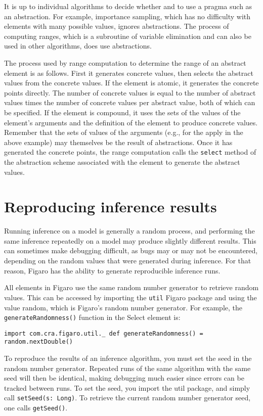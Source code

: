 It is up to individual algorithms to decide whether and to use a pragma such as an abstraction. For example, importance sampling, which has no difficulty with elements with many possible values, ignores abstractions. The process of computing ranges, which is a subroutine of variable elimination and can also be used in other algorithms, does use abstractions.

The process used by range computation to determine the range of an abstract element is as follows. First it generates concrete values, then selects the abstract values from the concrete values. If the element is atomic, it generates the concrete points directly. The number of concrete values is equal to the number of abstract values times the number of concrete values per abstract value, both of which can be specified. If the element is compound, it uses the sets of the values of the element's arguments and the definition of the element to produce concrete values. Remember that the sets of values of the arguments (e.g., for the apply in the above example) may themselves be the result of abstractions. Once it has generated the concrete points, the range computation calls the \texttt{select} method of the abstraction scheme associated with the element to generate the abstract values.

\section{Reproducing inference results}

Running inference on a model is generally a random process, and performing the same inference repeatedly on a model may produce slightly different results. This can sometimes make debugging difficult, as bugs may or may not be encountered, depending on the random values that were generated during inference. For that reason, Figaro has the ability to generate reproducible inference runs.

All elements in Figaro use the same random number generator to retrieve random values. This can be accessed by importing the \texttt{util} Figaro package and using the value random, which is Figaro's random number generator. For example, the \texttt{generateRandomness()} function in the Select element is:

\begin{flushleft}
\texttt{import com.cra.figaro.util.\_
\newline 
\newline def generateRandomness() = random.nextDouble()
}
\end{flushleft}

To reproduce the results of an inference algorithm, you must set the seed in the random number generator. Repeated runs of the same algorithm with the same seed will then be identical, making debugging much easier since errors can be tracked between runs. To set the seed, you import the util package, and simply call \texttt{setSeed(s: Long)}. To retrieve the current random number generator seed, one calls \texttt{getSeed()}.
